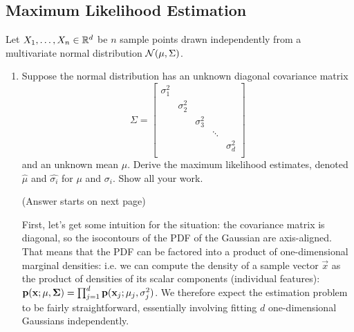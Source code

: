 \newpage
\subsection{Maximum Likelihood Estimation}
Let $X_1, \ldots, X_n \in \mathbb{R}^d$ be $n$ sample points drawn independently from a multivariate normal distribution $\mathcal{N}(\mu, \Sigma)$.
\begin{enumerate}[label=(\alph*)]
    \item Suppose the normal distribution has an unknown diagonal covariance matrix
    $$
    \Sigma =
    \begin{bmatrix}
    \sigma_1^2 & & & & \\
    & \sigma_2^2 & & & \\
    & & \sigma_3^2 & & \\
    & & & \ddots & \\
    & & & & \sigma_d^2 \\
    \end{bmatrix}
    $$
    and an unknown mean $\mu$. Derive the maximum likelihood estimates, denoted
    $\hat{\mu}$ and $\hat{\sigma_i}$ for $\mu$ and $\sigma_i$. Show all your
    work.

    (Answer starts on next page)

    \begin{mdframed}
      First, let's get some intuition for the situation: the covariance matrix
      is diagonal, so the isocontours of the PDF of the Gaussian are
      axis-aligned. That means that the PDF can be factored into a product of
      one-dimensional marginal densities: i.e. we can compute the density of a
      sample vector $\vec x$ as the product of densities of its scalar
      components (individual features):
      $\mathbf{p}(\mathbf x;\mathbf \mu, \mathbf \Sigma) = \prod_{j=1}^d \mathbf{p}(\mathbf x_j; \mu_j,
      \sigma^2_j)$. We therefore expect the estimation problem to be fairly
      straightforward, essentially involving fitting $d$ one-dimensional
      Gaussians independently.


\end{mdframed}
\end{enumerate}
